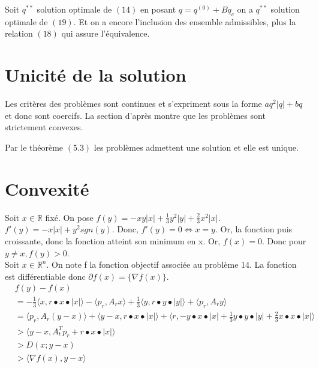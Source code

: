 \documentclass[12pt, letterpaper]{article}
\newcommand{\R}{\mathbb{R}^n}
\begin{document}
\noindent Soit $q^{**}$ solution optimale de $(14)$ en posant $q = q^{(0)} + B q_c$ on a $q^{**}$ solution optimale de $(19)$. Et on a encore l’inclusion des ensemble admissibles, plus la relation $(18)$ qui assure l'équivalence.

\section{Unicité de la solution}

Les critères des problèmes sont continues et s'expriment sous la forme $a q^2|q| + b q$ et donc sont coercifs. La section d'après montre que les problèmes sont strictement convexes.

Par le théorème $(5.3)$ les problèmes admettent une solution et elle est unique.

\section{Convexité}
Soit $x\in \mathbb{R}$ fixé. On pose $f(y) = -x y |x| + \frac{1}{3} y^2 |y| + \frac{2}{3} x^2 |x|$.
 $f'(y) = -x |x| + y^2 sgn(y)$. Donc, $f'(y) = 0 \Leftrightarrow x = y$. Or, la fonction puis croissante, donc la fonction atteint son minimum en x. Or, $f(x) = 0$. Donc pour $y \neq x, f(y) > 0
$. \\

Soit $x\in\R$. On note f la fonction objectif associée au problème 14. La fonction est différentiable donc $\partial f(x) = \{\nabla f(x)\}$. 
\begin{align*}
&f(y) - f(x) \\
&= -\frac{1}{3} \langle x,r \bullet x \bullet |x|\rangle  - \langle p_r,A_rx\rangle  + \frac{1}{3}\langle y,r \bullet y \bullet |y|\rangle  + \langle p_r,A_ry\rangle   \\
&= \langle p_r,A_r(y - x)\rangle  + \langle y-x, r \bullet x \bullet |x|\rangle  + \langle r, -y \bullet x \bullet |x| + \frac{1}{3}y \bullet y \bullet |y| + \frac{2}{3}x \bullet x \bullet |x|\rangle \\
&>  \langle y-x,A_t^Tp_r + r \bullet x \bullet |x|\rangle  \tag{les termes que l'on a enlevé étaient positifs par le lemme ci-dessus} \\
&>  D(x;y-x)\\
&>  \langle \nabla f(x),y-x\rangle 
\end{align*}
\end{document}

